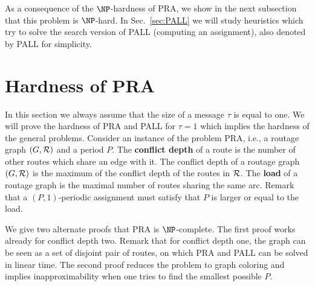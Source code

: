 \documentclass[a4paper,10pt]{article}
\begin{document}
      As a consequence of the $\NP$-hardness of PRA, we show in the next subsection that this problem is $\NP$-hard. 
      In Sec.~\ref{sec:PALL} we will study heuristics which try to solve the search version of PALL (computing an assignment), also denoted by PALL for simplicity.

  
\section{Hardness of PRA}
  \label{sec:complexity}

 In this section we always assume that the size of a message $\tau$ is equal to one. 
 We will prove the hardness of PRA and PALL for $\tau =1$ which implies the hardness of the general problems. 
Consider an instance of the problem PRA, i.e., a routage graph $(G,\cal{R})$ and a period $P$.
The {\bf conflict depth} of a route is the number of other routes which share an edge with it. 
The conflict depth of a routage graph $(G,\cal{R})$ is the maximum of the conflict depth of the routes in $\cal{R}$.
The {\bf load} of a routage graph is the maximal number of routes sharing the same arc.
Remark that a $(P,1)$-periodic assignment must satisfy that $P$ is larger or equal to the load.


We give two alternate proofs that PRA is $\NP$-complete.
The first proof works already for conflict depth two. Remark that for conflict depth one,
the graph can be seen as a set of disjoint pair of routes, on which PRA and PALL can be solved in linear time. 
 The second proof reduces the problem to graph coloring and implies inapproximability when one tries to find the smallest possible $P$. \\
\end{document}
